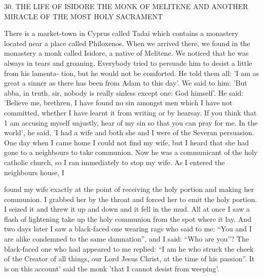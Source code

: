 30. THE LIFE OF ISIDORE THE MONK OF MELITENE
AND ANOTHER MIRACLE OF THE MOST HOLY SACRAMENT

There is a market-town in Cyprus called Tadai which contains a
monastery located near a place called Philoxenos. When we arrived
there, we found in the monastery a monk called Isidore, a native of
Melitene. We noticed that he was always in tears and groaning.
Everybody tried to persuade him to desist a little from his lamenta-
tion, but he would not be comforted. He told them all: 'I am as
great a sinner as there has been from Adam to this day'. We said to
him: 'But abba, in truth, sir, nobody is really sinless except one:
God himself'. He said: 'Believe me, brethren, I have found no sin
amongst men which I have not committed, whether I have learnt it
from writing or by hearsay. If you think that 1 am accusing myself
unjustly, hear of my sin so that you can pray for me. In the world',
he said, 'I had a wife and both she and I were of the Severan
persuasion. One day when I came home I could not find my wife,
but I heard that she had gone to a neighbour\textquotesingle s to take communion.
Now he was a communicant of the holy catholic church, so I ran
immediately to stop my wife. As I entered the neighbour\textquotesingle s house, I

found my wife exactly at the point of receiving the holy portion and
making her communion. I grabbed her by the throat and forced her
to emit the holy portion. I seized it and threw it up and down and
it fell in the mud. All at once I saw a flash of lightening take up the
holy communion from the spot where it lay. And two days later I
saw a black-faced one wearing rags who said to me: “You and I are
alike condemned to the same damnation”, and I said: “Who are
you”? The black-faced one who had appeared to me replied: “I am
he who struck the cheek of the Creator of all things, our Lord Jesus
Christ, at the time of his passion”. It is on this account' said the
monk 'that I cannot desist from weeping'.

